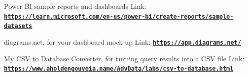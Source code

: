 \documentclass[12pt]{article}
\begin{document}
Power BI sample reports and dashboards
Link: \href{https://learn.microsoft.com/en-us/power-bi/create-reports/sample-datasets}{\textbf{\nolinkurl{https://learn.microsoft.com/en-us/power-bi/create-reports/sample-datasets}}}

diagrams.net, for your dashboard mock-up
Link: \href{https://app.diagrams.net/}{\textbf{\nolinkurl{https://app.diagrams.net/}}}

My CSV to Database Converter, for turning query results into a CSV file
Link: \href{https://www.aholdengouveia.name/AdvData/labs/csv-to-database.html}{\textbf{\nolinkurl{https://www.aholdengouveia.name/AdvData/labs/csv-to-database.html}}}
\end{document}
